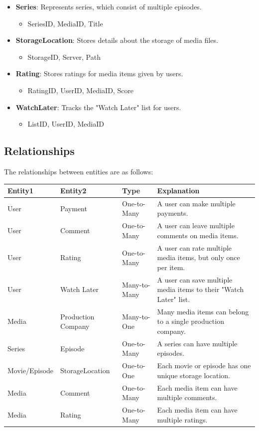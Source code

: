 \documentclass[13pt]{article}
\begin{document}
\begin{itemize}
\begin{itemize}
            \item MovieID, StorageID, MediaID, Title
        \end{itemize}
    \item \textbf{Series}: Represents series, which consist of multiple episodes.
        \begin{itemize}
            \item SeriesID, MediaID, Title
        \end{itemize}
    \item \textbf{StorageLocation}: Stores details about the storage of media files.
        \begin{itemize}
            \item StorageID, Server, Path
        \end{itemize}
    \item \textbf{Rating}: Stores ratings for media items given by users.
        \begin{itemize}
            \item RatingID, UserID, MediaID, Score
        \end{itemize}
    \item \textbf{WatchLater}: Tracks the "Watch Later" list for users.
        \begin{itemize}
            \item ListID, UserID, MediaID
        \end{itemize}
\end{itemize}

\subsection{Relationships}
The relationships between entities are as follows:
\begin{longtable}{|p{3cm}|p{3cm}|p{2.5cm}|p{5cm}|}
\hline
\textbf{Entity1} & \textbf{Entity2} & \textbf{Type} & \textbf{Explanation} \\
\hline
User & Payment & One-to-Many & A user can make multiple payments. \\
User & Comment & One-to-Many & A user can leave multiple comments on media items. \\
User & Rating & One-to-Many & A user can rate multiple media items, but only once per item. \\
User & Watch Later & Many-to-Many & A user can save multiple media items to their "Watch Later" list. \\
Media & Production Company & Many-to-One & Many media items can belong to a single production company. \\
Series & Episode & One-to-Many & A series can have multiple episodes. \\
Movie/Episode & StorageLocation & One-to-One & Each movie or episode has one unique storage location. \\
Media & Comment & One-to-Many & Each media item can have multiple comments. \\
Media & Rating & One-to-Many & Each media item can have multiple ratings. \\
\hline
\end{longtable}
\end{document}
